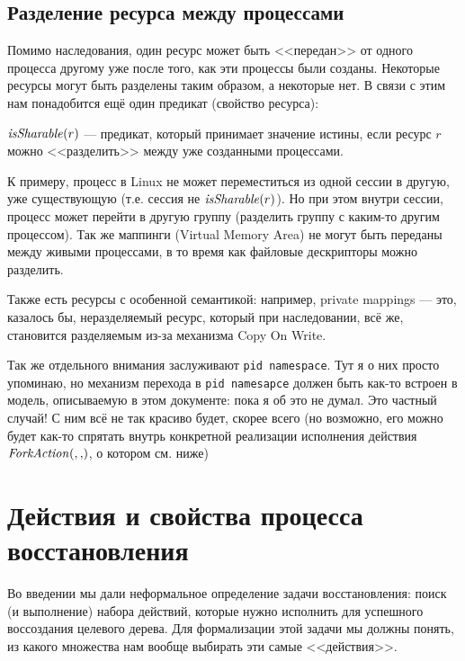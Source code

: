\subsection{Разделение ресурса между процессами}
\label{subsec:shareres}

Помимо наследования, один ресурс может быть <<передан>> от одного процесса другому уже после того, как эти процессы были созданы. Некоторые ресурсы могут быть разделены таким образом, а некоторые нет. В связи с этим нам понадобится ещё один предикат (свойство ресурса):

\begin{defn}
\label{def:issharable}
$\text{\textit{isSharable}}(r)$ --- предикат, который принимает значение истины, если ресурс $r$ можно <<разделить>> между уже созданными процессами.
\end{defn}

\begin{exmp}
К примеру, процесс в Linux не может переместиться из одной сессии в другую, уже существующую (т.е. сессия не $\text{\textit{isSharable}}(r)$). Но при этом внутри сессии, процесс может перейти в другую группу (разделить группу с каким-то другим процессом). Так же маппинги (Virtual Memory Area) не могут быть переданы между живыми процессами, в то время как файловые дескрипторы можно разделить.
\end{exmp}

Также есть ресурсы с особенной семантикой: например, private mappings --- это, казалось бы, неразделяемый ресурс, который при наследовании, всё же, становится разделяемым из-за механизма Copy On Write.

\begin{note}
Так же отдельного внимания заслуживают \texttt{pid namespace}. Тут я о них просто упоминаю, но механизм перехода в \texttt{pid namesapce} должен быть как-то встроен в модель, описываемую в этом документе: пока я об это не думал. Это частный случай! С ним всё не так красиво будет, скорее всего (но возможно, его можно будет как-то спрятать внутрь конкретной реализации исполнения действия $\crfork{}{}$, о котором см. ниже)
\end{note}

\section{Действия и свойства процесса восстановления}

Во введении мы дали неформальное определение задачи восстановления: поиск (и выполнение) набора действий, которые нужно исполнить для успешного воссоздания целевого дерева. Для формализации этой задачи мы должны понять, из какого множества нам вообще выбирать эти самые <<действия>>.

